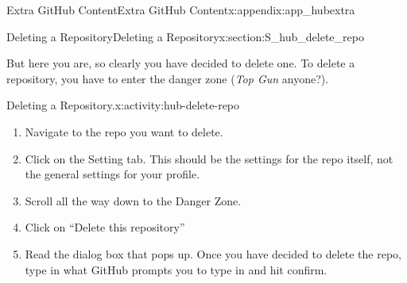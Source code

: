 \documentclass[oneside,10pt,]{book}
\newcommand{\pubtitle}[1]{\textsl{#1}}
\begin{document}
\begin{appendixptx}{Extra GitHub Content}{}{Extra GitHub Content}{}{}{x:appendix:app_hubextra}
\begin{sectionptx}{Deleting a Repository}{}{Deleting a Repository}{}{}{x:section:S_hub_delete_repo}
\par
But here you are, so clearly you have decided to delete one. To delete a repository, you have to enter the danger zone (\pubtitle{Top Gun} anyone?).%
\begin{activity}{Deleting a Repository.}{x:activity:hub-delete-repo}%
\begin{enumerate}[font=\bfseries,label=(\alph*),ref=\alph*]
\item{}Navigate to the repo you want to delete.%
\item{}Click on the Setting tab. This should be the settings for the repo itself, not the general settings for your profile.%
\item{}Scroll all the way down to the Danger Zone.%
\item{}Click on ``Delete this repository''%
\item{}Read the dialog box that pops up. Once you have decided to delete the repo, type in what GitHub prompts you to type in and hit confirm.%
\end{enumerate}
\end{activity}%
\end{sectionptx}
\end{appendixptx}
%
%
\typeout{************************************************}
\typeout{************************************************}
%
\end{document}
